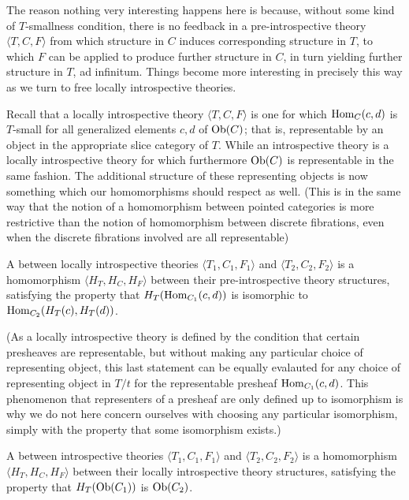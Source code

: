 The reason nothing very interesting happens here is because, without some kind of $T$-smallness condition, there is no feedback in a pre-introspective theory $\langle T, C, F \rangle$ from which structure in $C$ induces corresponding structure in $T$, to which $F$ can be applied to produce further structure in $C$, in turn yielding further structure in $T$, ad infinitum. Things become more interesting in precisely this way as we turn to free locally introspective theories.

Recall that a locally introspective theory $\langle T, C, F \rangle$ is one for which $\operatorname{Hom}_C(c, d)$ is $T$-small for all generalized elements $c, d$ of $\operatorname{Ob}(C)$; that is, representable by an object in the appropriate slice category of $T$. While an introspective theory is a locally introspective theory for which furthermore $\operatorname{Ob}(C)$ is representable in the same fashion. The additional structure of these representing objects is now something which our homomorphisms should respect as well. (This is in the same way that the notion of a homomorphism between pointed categories is more restrictive than the notion of homomorphism between discrete fibrations, even when the discrete fibrations involved are all representable)

\begin{definition}
A  between locally introspective theories $\langle T_1, C_1, F_1 \rangle$ and $\langle T_2, C_2, F_2 \rangle$ is a homomorphism $\langle H_T, H_C, H_F \rangle$ between their pre-introspective theory structures, satisfying the property that $H_T(\operatorname{Hom}_{C_1}(c, d))$ is isomorphic to $\operatorname{Hom}_{C_2}(H_T(c), H_T(d))$.


(As a locally introspective theory is defined by the condition that certain presheaves are representable, but without making any particular choice of representing object, this last statement can be equally evalauted for any choice of representing object in $T/t$ for the representable presheaf $\operatorname{Hom}_{C_1}(c, d)$. This phenomenon that representers of a presheaf are only defined up to isomorphism is why we do not here concern ourselves with choosing any particular isomorphism, simply with the property that some isomorphism exists.)
\end{definition}

\begin{definition}
A  between introspective theories $\langle T_1, C_1, F_1 \rangle$ and $\langle T_2, C_2, F_2 \rangle$ is a homomorphism $\langle H_T, H_C, H_F \rangle$ between their locally introspective theory structures, satisfying the property that $H_T(\operatorname{Ob}(C_1))$ is $\operatorname{Ob}(C_2)$.
\end{definition}

